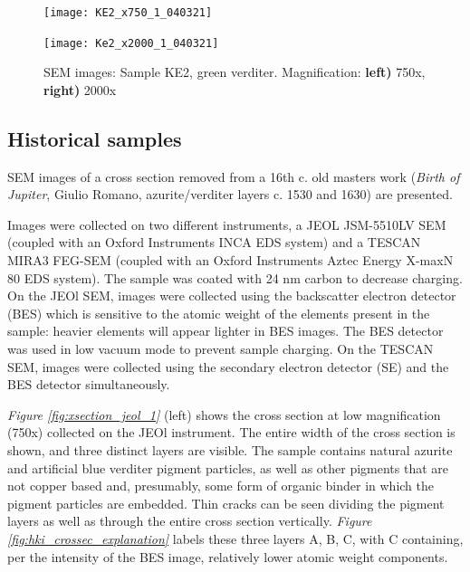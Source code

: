 \begin{figure}[H]
\centering
\begin{minipage}{.45\textwidth}
  \centering
  \texttt{[image: KE2\_x750\_1\_040321]}
\end{minipage}
\begin{minipage}{.45\textwidth}
  \centering
  \texttt{[image: Ke2\_x2000\_1\_040321]}
\end{minipage}
\caption[SEM images: Sample KE2, green verditer]{SEM images: Sample KE2, green verditer. Magnification: \textbf{left)} 750x, \textbf{right)} 2000x}
\label{fig:KE2_sem_1}
\end{figure}


\subsection[Historical samples]{Historical samples}
\label{subsection3.1.3}

SEM images of a cross section removed from a 16th c. old masters work (\textit{Birth of Jupiter}, Giulio Romano, azurite/verditer layers c. 1530 and 1630) are presented.

Images were collected on two different instruments, a JEOL JSM-5510LV SEM (coupled with an Oxford Instruments INCA EDS system) and a TESCAN MIRA3 FEG-SEM (coupled with an Oxford Instruments Aztec Energy X-maxN 80 EDS system). The sample was coated with 24 nm carbon to decrease charging. On the JEOl SEM, images were collected using the backscatter electron detector (BES) which is sensitive to the atomic weight of the elements present in the sample: heavier elements will appear lighter in BES images. The BES detector was used in low vacuum mode to prevent sample charging. On the TESCAN SEM, images were collected using the secondary electron detector (SE) and the BES detector simultaneously. 

\textit{Figure \ref{fig:xsection_jeol_1}} (left) shows the cross section at low magnification (750x) collected on the JEOl instrument. The entire width of the cross section is shown, and three distinct layers are visible. The sample contains natural azurite and artificial blue verditer pigment particles, as well as other pigments that are not copper based and, presumably, some form of organic binder in which the pigment particles are embedded. Thin cracks can be seen dividing the pigment layers as well as through the entire cross section vertically. \textit{Figure \ref{fig:hki_crossec_explanation}} labels these three layers A, B, C, with C containing, per the intensity of the BES image, relatively lower atomic weight components. 

